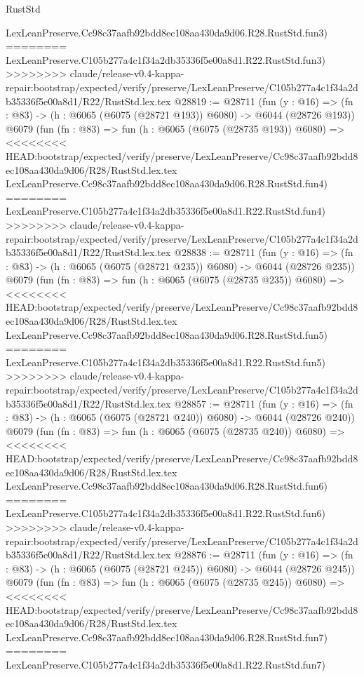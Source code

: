 \begin{lexlean}{RustStd}
\begin{coremodule}
{\begin{coremodule}
{{{{{{{{{{{{{{{{{{{{{{{{{{    LexLeanPreserve.Cc98c37aafb92bdd8ec108aa430da9d06.R28.RustStd.fun3)
========
    LexLeanPreserve.C105b277a4c1f34a2db35336f5e00a8d1.R22.RustStd.fun3)
>>>>>>>> claude/release-v0.4-kappa-repair:bootstrap/expected/verify/preserve/LexLeanPreserve/C105b277a4c1f34a2db35336f5e00a8d1/R22/RustStd.lex.tex
@28819 := @28711
    (fun (y : @16) => (fn : @83) -> (h : @6065 (@6075 (@28721 @193)) @6080) -> @6044 (@28726 @193))
    @6079
    (fun (fn : @83) =>
    fun (h : @6065 (@6075 (@28735 @193)) @6080) =>
<<<<<<<< HEAD:bootstrap/expected/verify/preserve/LexLeanPreserve/Cc98c37aafb92bdd8ec108aa430da9d06/R28/RustStd.lex.tex
    LexLeanPreserve.Cc98c37aafb92bdd8ec108aa430da9d06.R28.RustStd.fun4)
========
    LexLeanPreserve.C105b277a4c1f34a2db35336f5e00a8d1.R22.RustStd.fun4)
>>>>>>>> claude/release-v0.4-kappa-repair:bootstrap/expected/verify/preserve/LexLeanPreserve/C105b277a4c1f34a2db35336f5e00a8d1/R22/RustStd.lex.tex
@28838 := @28711
    (fun (y : @16) => (fn : @83) -> (h : @6065 (@6075 (@28721 @235)) @6080) -> @6044 (@28726 @235))
    @6079
    (fun (fn : @83) =>
    fun (h : @6065 (@6075 (@28735 @235)) @6080) =>
<<<<<<<< HEAD:bootstrap/expected/verify/preserve/LexLeanPreserve/Cc98c37aafb92bdd8ec108aa430da9d06/R28/RustStd.lex.tex
    LexLeanPreserve.Cc98c37aafb92bdd8ec108aa430da9d06.R28.RustStd.fun5)
========
    LexLeanPreserve.C105b277a4c1f34a2db35336f5e00a8d1.R22.RustStd.fun5)
>>>>>>>> claude/release-v0.4-kappa-repair:bootstrap/expected/verify/preserve/LexLeanPreserve/C105b277a4c1f34a2db35336f5e00a8d1/R22/RustStd.lex.tex
@28857 := @28711
    (fun (y : @16) => (fn : @83) -> (h : @6065 (@6075 (@28721 @240)) @6080) -> @6044 (@28726 @240))
    @6079
    (fun (fn : @83) =>
    fun (h : @6065 (@6075 (@28735 @240)) @6080) =>
<<<<<<<< HEAD:bootstrap/expected/verify/preserve/LexLeanPreserve/Cc98c37aafb92bdd8ec108aa430da9d06/R28/RustStd.lex.tex
    LexLeanPreserve.Cc98c37aafb92bdd8ec108aa430da9d06.R28.RustStd.fun6)
========
    LexLeanPreserve.C105b277a4c1f34a2db35336f5e00a8d1.R22.RustStd.fun6)
>>>>>>>> claude/release-v0.4-kappa-repair:bootstrap/expected/verify/preserve/LexLeanPreserve/C105b277a4c1f34a2db35336f5e00a8d1/R22/RustStd.lex.tex
@28876 := @28711
    (fun (y : @16) => (fn : @83) -> (h : @6065 (@6075 (@28721 @245)) @6080) -> @6044 (@28726 @245))
    @6079
    (fun (fn : @83) =>
    fun (h : @6065 (@6075 (@28735 @245)) @6080) =>
<<<<<<<< HEAD:bootstrap/expected/verify/preserve/LexLeanPreserve/Cc98c37aafb92bdd8ec108aa430da9d06/R28/RustStd.lex.tex
    LexLeanPreserve.Cc98c37aafb92bdd8ec108aa430da9d06.R28.RustStd.fun7)
========
    LexLeanPreserve.C105b277a4c1f34a2db35336f5e00a8d1.R22.RustStd.fun7)
}}}}}}}}}}}}}}}}}}}}}}}}}}
\end{coremodule}}
\end{coremodule}
\end{lexlean}
